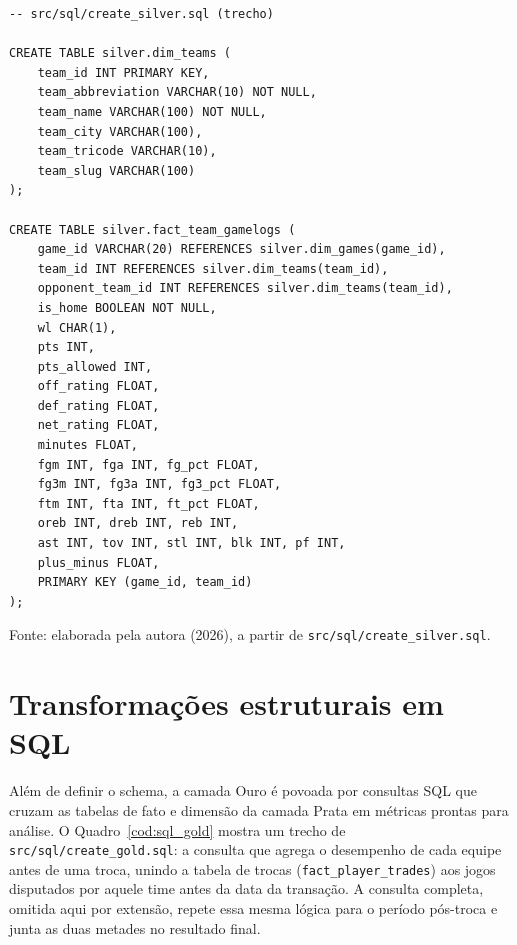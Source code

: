\begin{codelisting}[htb]
\makeatletter
{}
\makeatother
\label{cod:ddl_silver}
\begin{verbatim}
-- src/sql/create_silver.sql (trecho)

CREATE TABLE silver.dim_teams (
    team_id INT PRIMARY KEY,
    team_abbreviation VARCHAR(10) NOT NULL,
    team_name VARCHAR(100) NOT NULL,
    team_city VARCHAR(100),
    team_tricode VARCHAR(10),
    team_slug VARCHAR(100)
);

CREATE TABLE silver.fact_team_gamelogs (
    game_id VARCHAR(20) REFERENCES silver.dim_games(game_id),
    team_id INT REFERENCES silver.dim_teams(team_id),
    opponent_team_id INT REFERENCES silver.dim_teams(team_id),
    is_home BOOLEAN NOT NULL,
    wl CHAR(1),
    pts INT,
    pts_allowed INT,
    off_rating FLOAT,
    def_rating FLOAT,
    net_rating FLOAT,
    minutes FLOAT,
    fgm INT, fga INT, fg_pct FLOAT,
    fg3m INT, fg3a INT, fg3_pct FLOAT,
    ftm INT, fta INT, ft_pct FLOAT,
    oreb INT, dreb INT, reb INT,
    ast INT, tov INT, stl INT, blk INT, pf INT,
    plus_minus FLOAT,
    PRIMARY KEY (game_id, team_id)
);
\end{verbatim}
\begin{flushleft}
\footnotesize Fonte: elaborada pela autora (2026), a partir de \texttt{src/sql/create\_silver.sql}.
\end{flushleft}
\end{codelisting}

\section{Transformações estruturais em SQL}
\label{sec:apendice_sql}

Além de definir o schema, a camada Ouro é povoada por consultas SQL que cruzam as tabelas de fato e dimensão da camada Prata em métricas prontas para análise. O Quadro~\ref{cod:sql_gold} mostra um trecho de \texttt{src/sql/create\_gold.sql}: a consulta que agrega o desempenho de cada equipe antes de uma troca, unindo a tabela de trocas (\texttt{fact\_player\_trades}) aos jogos disputados por aquele time antes da data da transação. A consulta completa, omitida aqui por extensão, repete essa mesma lógica para o período pós-troca e junta as duas metades no resultado final.

